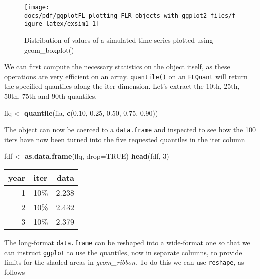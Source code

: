 \documentclass[]{article}
\newenvironment{Shaded}{\begin{snugshade}}{\end{snugshade}}
\newcommand{\KeywordTok}[1]{\textcolor[rgb]{0.13,0.29,0.53}{\textbf{{#1}}}}
\newcommand{\DataTypeTok}[1]{\textcolor[rgb]{0.13,0.29,0.53}{{#1}}}
\newcommand{\DecValTok}[1]{\textcolor[rgb]{0.00,0.00,0.81}{{#1}}}
\newcommand{\FloatTok}[1]{\textcolor[rgb]{0.00,0.00,0.81}{{#1}}}
\newcommand{\StringTok}[1]{\textcolor[rgb]{0.31,0.60,0.02}{{#1}}}
\newcommand{\OtherTok}[1]{\textcolor[rgb]{0.56,0.35,0.01}{{#1}}}
\newcommand{\NormalTok}[1]{{#1}}
\begin{document}
\begin{figure}

{\centering \texttt{[image: docs/pdf/ggplotFL\_plotting\_FLR\_objects\_with\_ggplot2\_files/figure-latex/exsim1-1]} 

}

\caption{Distribution of values of a simulated time series plotted using geom_boxplot()}\label{fig:exsim1}
\end{figure}

We can first compute the necessary statistics on the object itself, as
these operations are very efficient on an array. \texttt{quantile()} on
an \texttt{FLQuant} will return the specified quantiles along the iter
dimension. Let's extract the 10th, 25th, 50th, 75th and 90th quantiles.

\begin{Shaded}
\begin{Highlighting}[]
\NormalTok{flq <-}\StringTok{ }\KeywordTok{quantile}\NormalTok{(fla, }\KeywordTok{c}\NormalTok{(}\FloatTok{0.10}\NormalTok{, }\FloatTok{0.25}\NormalTok{, }\FloatTok{0.50}\NormalTok{, }\FloatTok{0.75}\NormalTok{, }\FloatTok{0.90}\NormalTok{))}
\end{Highlighting}
\end{Shaded}

The object can now be coerced to a \texttt{data.frame} and inspected to
see how the 100 iters have now been turned into the five requested
quantiles in the iter column

\begin{Shaded}
\begin{Highlighting}[]
\NormalTok{fdf <-}\StringTok{ }\KeywordTok{as.data.frame}\NormalTok{(flq, }\DataTypeTok{drop=}\OtherTok{TRUE}\NormalTok{)}
\KeywordTok{head}\NormalTok{(fdf, }\DecValTok{3}\NormalTok{)}
\end{Highlighting}
\end{Shaded}

\begin{longtable}[c]{@{}rlr@{}}
\toprule
year & iter & data\tabularnewline
\midrule
\endhead
1 & 10\% & 2.238\tabularnewline
2 & 10\% & 2.432\tabularnewline
3 & 10\% & 2.379\tabularnewline
\bottomrule
\end{longtable}

The long-format \texttt{data.frame} can be reshaped into a wide-format
one so that we can instruct \texttt{ggplot} to use the quantiles, now in
separate columns, to provide limits for the shaded areas in
\emph{geom\_ribbon}. To do this we can use \texttt{reshape}, as follows
\end{document}
